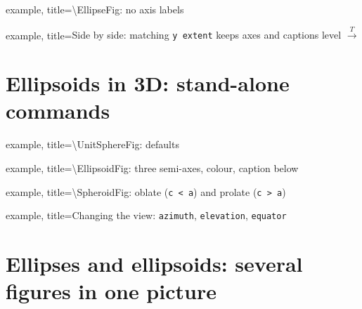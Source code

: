 \documentclass[11pt]{article}
\begin{document}
\begin{tcblisting}{example, title={\textbackslash EllipseFig: no axis labels}}
\EllipseFig[a=1.5, b=.75, x1 label=, x2 label=]
\end{tcblisting}

\begin{tcblisting}{example, title={Side by side: matching \texttt{y extent}
    keeps axes and captions level}}
\UnitDiskFig[label below=$D$, y extent=1.6, scale=.75]
\quad $\xrightarrow{\;T\;}$ \quad
\EllipseFig[a=2, b=.75, a label=$a$, b label=$b$,
            label below=$E$, y extent=1.6, scale=.75]
\end{tcblisting}

\section*{Ellipsoids in 3D: stand-alone commands}

\begin{tcblisting}{example, title={\textbackslash UnitSphereFig: defaults}}
\UnitSphereFig
\end{tcblisting}

\begin{tcblisting}{example, title={\textbackslash EllipsoidFig: three
    semi-axes, colour, caption below}}
\EllipsoidFig[a=1.2, b=1.6, c=1, a label=$a$, b label=$b$, c label=$c$,
              fill=blue!25, label below=$T(B)$, scale=1]
\end{tcblisting}

\begin{tcblisting}{example, title={\textbackslash SpheroidFig: oblate
    (\texttt{c < a}) and prolate (\texttt{c > a})}}
\SpheroidFig[a=1.4, c=0.8, a label=$a$, b label=$a$, c label=$c$, scale=1]
\qquad
\SpheroidFig[a=0.7, c=1.4, scale=1]
\end{tcblisting}

\begin{tcblisting}{example, title={Changing the view: \texttt{azimuth},
    \texttt{elevation}, \texttt{equator}}}
\EllipsoidFig[a=2, b=.75, scale=1, azimuth=-20, elevation=35]
\qquad
\SpheroidFig[a=0.7, c=1.4, azimuth=45, elevation=30,
             equator=false, scale=1]
\end{tcblisting}

\section*{Ellipses and ellipsoids: several figures in one picture}
\end{document}
